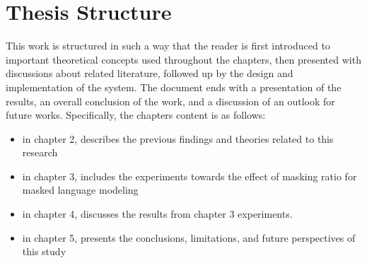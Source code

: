 

\section{Thesis Structure}


This work is structured in such a way that the reader is first introduced to important theoretical concepts used throughout the chapters, then presented with discussions about related literature, followed up by the design and implementation of the system. The document ends with a presentation of the results, an overall conclusion of the work, and a discussion of an outlook for future works. Specifically, the chapters content is as follows:

\begin{itemize}
    \item in chapter 2, describes the previous findings and theories related to this research
    \item in chapter 3, includes the experiments towards the effect of masking ratio for masked language modeling
    \item in chapter 4, discusses the results from chapter 3 experiments.
    \item in chapter 5, presents the conclusions, limitations, and future perspectives of this study
\end{itemize}
